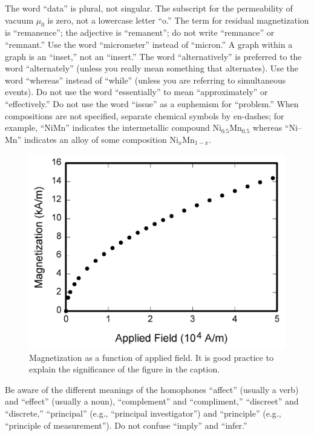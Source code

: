 \documentclass[journal,twoside,web]{ieeecolor2}
\begin{document}
The word ``data'' is plural, not singular.
The subscript for the 
permeability of vacuum $\mu _{0}$ is zero, not a lowercase letter 
``o.'' The term for residual magnetization is ``remanence''; the adjective 
is ``remanent''; do not write ``remnance'' or ``remnant.'' Use the word 
``micrometer'' instead of ``micron.'' A graph within a graph is an 
``inset,'' not an ``insert.'' The word ``alternatively'' is preferred to the 
word ``alternately'' (unless you really mean something that alternates).
Use 
the word ``whereas'' instead of ``while'' (unless you are referring to 
simultaneous events).
Do not use the word ``essentially'' to mean 
``approximately'' or ``effectively.'' Do not use the word ``issue'' as a 
euphemism for ``problem.'' When compositions are not specified, separate 
chemical symbols by en-dashes; for example, ``NiMn'' indicates the 
intermetallic compound Ni$_{0.5}$Mn$_{0.5}$ whereas 
``Ni--Mn'' indicates an alloy of some composition 
Ni$_{x}$Mn$_{1-x}$.

\begin{figure}[!t]
\centerline{\includegraphics[width=\columnwidth]{fig1.png}}
\caption{Magnetization as a function of applied field.
It is good practice to explain the significance of the figure in the caption.}
\label{fig1}
\end{figure}

Be aware of the different meanings of the homophones ``affect'' (usually a 
verb) and ``effect'' (usually a noun), ``complement'' and ``compliment,'' 
``discreet'' and ``discrete,'' ``principal'' (e.g., ``principal 
investigator'') and ``principle'' (e.g., ``principle of measurement'').
Do 
not confuse ``imply'' and ``infer.'' 
\end{document}
